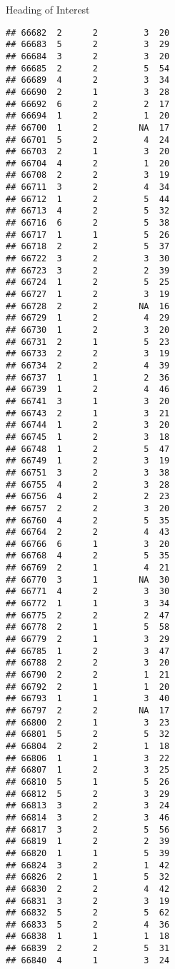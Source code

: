 \documentclass[
  ignorenonframetext,
]{beamer}
\begin{document}
\begin{frame}[fragile]{Heading of Interest}
\begin{verbatim}
## 66682  2      2         3  20
## 66683  5      2         3  29
## 66684  3      2         3  20
## 66685  2      2         5  54
## 66689  4      2         3  34
## 66690  2      1         3  28
## 66692  6      2         2  17
## 66694  1      2         1  20
## 66700  1      2        NA  17
## 66701  5      2         4  24
## 66703  2      1         3  20
## 66704  4      2         1  20
## 66708  2      2         3  19
## 66711  3      2         4  34
## 66712  1      2         5  44
## 66713  4      2         5  32
## 66716  6      2         5  38
## 66717  1      1         5  26
## 66718  2      2         5  37
## 66722  3      2         3  30
## 66723  3      2         2  39
## 66724  1      2         5  25
## 66727  1      2         3  19
## 66728  2      2        NA  16
## 66729  1      2         4  29
## 66730  1      2         3  20
## 66731  2      1         5  23
## 66733  2      2         3  19
## 66734  2      2         4  39
## 66737  1      1         2  36
## 66739  1      2         4  46
## 66741  3      1         3  20
## 66743  2      1         3  21
## 66744  1      2         3  20
## 66745  1      2         3  18
## 66748  1      2         5  47
## 66749  1      2         3  19
## 66751  3      2         3  38
## 66755  4      2         3  28
## 66756  4      2         2  23
## 66757  2      2         3  20
## 66760  4      2         5  35
## 66764  2      2         4  43
## 66766  6      1         3  20
## 66768  4      2         5  35
## 66769  2      1         4  21
## 66770  3      1        NA  30
## 66771  4      2         3  30
## 66772  1      1         3  34
## 66775  2      2         2  47
## 66778  2      1         5  58
## 66779  2      1         3  29
## 66785  1      2         3  47
## 66788  2      2         3  20
## 66790  2      2         1  21
## 66792  2      1         1  20
## 66793  1      1         3  40
## 66797  2      2        NA  17
## 66800  2      1         3  23
## 66801  5      2         5  32
## 66804  2      2         1  18
## 66806  1      1         3  22
## 66807  1      2         3  25
## 66810  5      1         5  26
## 66812  5      2         3  29
## 66813  3      2         3  24
## 66814  3      2         3  46
## 66817  3      2         5  56
## 66819  1      2         2  39
## 66820  1      1         5  39
## 66824  3      2         1  42
## 66826  2      1         5  32
## 66830  2      2         4  42
## 66831  3      2         3  19
## 66832  5      2         5  62
## 66833  5      2         4  36
## 66838  1      1         1  18
## 66839  2      2         5  31
## 66840  4      1         3  24

\end{verbatim}
\end{frame}
\end{document}
